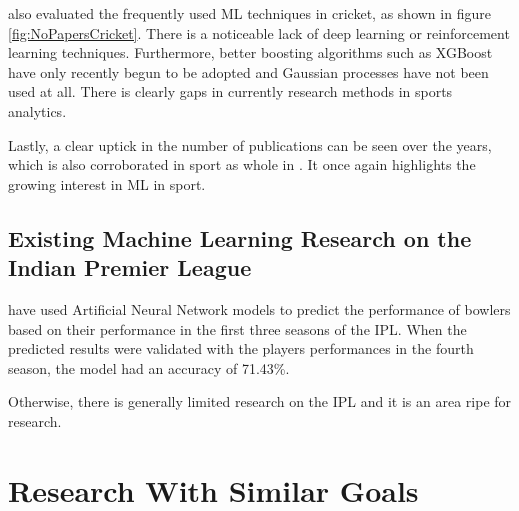 \documentclass[12pt,a4paper]{report}
\theoremstyle{definition}
\begin{document}
\citet{Wickramasinghe2022} also evaluated the frequently used ML techniques in cricket, as shown in figure \ref{fig:NoPapersCricket}. 
There is a noticeable lack of deep learning or reinforcement learning techniques.
Furthermore, better boosting algorithms such as XGBoost have only recently begun to be adopted and Gaussian processes have not been used at all.
There is clearly gaps in currently research methods in sports analytics.

Lastly, a clear uptick in the number of publications can be seen over the years, which is also corroborated in sport as whole in \citet{horvat2020}.
It once again highlights the growing interest in ML in sport.

\subsection{Existing Machine Learning Research on the Indian Premier League}

\citet{Saikia2012} have used Artificial Neural Network models to predict the performance of bowlers based on their performance in the first three seasons of the IPL. 
When the predicted results were validated with the players performances in the fourth season, the model had an accuracy of 71.43\%.

Otherwise, there is generally limited research on the IPL and it is an area ripe for research.

%
%

\section{Research With Similar Goals}
\end{document}
